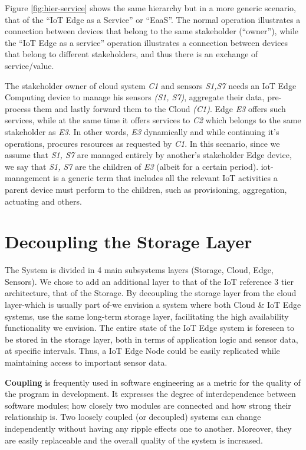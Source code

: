 Figure \ref{fig:hier-service} shows the same hierarchy but in a more generic scenario, that of the “IoT Edge as a Service” or “EaaS”.  The normal operation illustrates a connection between devices that belong to the same stakeholder (“owner”), while the “IoT Edge as a service” operation illustrates a connection between devices that belong to different stakeholders, and thus there is an exchange of service/value.

The stakeholder owner of cloud system \textit{C1} and sensors \textit{S1,S7} needs an IoT Edge Computing device to manage his sensors \textit{(S1, S7)}, aggregate their data, pre-process them and lastly forward them to the Cloud \textit{(C1)}. Edge \textit{E3} offers such services, while at the same time it offers services to \textit{C2} which belongs to the same stakeholder as \textit{E3}. In other words, \textit{E3} dynamically and while continuing it’s operations, procures resources as requested by \textit{C1}. In this scenario, since we assume that \textit{S1, S7} are managed entirely by another’s stakeholder Edge device, we say that \textit{S1, S7} are the children of \textit{E3} (albeit for a certain period). \gls{iot-management} is a generic term that includes all the relevant IoT activities a parent device must perform to the children, such as provisioning, aggregation, actuating and others.

\section {Decoupling the Storage Layer}

The System is divided in 4 main subsystems layers (Storage, Cloud, Edge, Sensors).  We chose to add an additional layer to that of the IoT reference 3 tier architecture\cite{tranoris}, that of the Storage. By decoupling the storage layer from the cloud layer-which is usually part of-we envision a system where both Cloud \& IoT Edge systems, use the same long-term storage layer, facilitating the high availability functionality we envision. The entire state of the IoT Edge system is foreseen to be stored in the storage layer, both in terms of application logic and sensor data, at specific intervals. Thus, a IoT Edge Node could be easily replicated while maintaining access to important sensor data. 

\textbf{Coupling} is frequently used in software engineering as a metric for the quality of the program in development. It expresses the degree of interdependence between software modules; how closely two modules are connected and how strong their relationship is.  Two loosely coupled (or decoupled) systems can change independently without having any ripple effects one to another. Moreover, they are easily replaceable and the overall quality of the system is increased.

